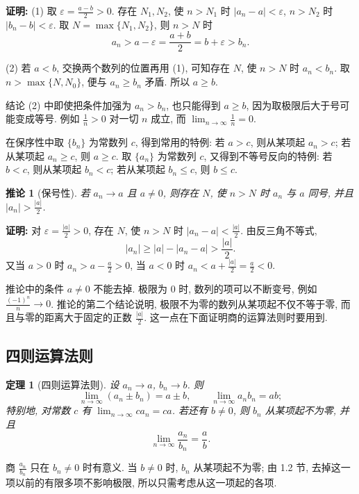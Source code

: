 \documentclass[UTF8,openany]{ctexbook}
\theoremstyle{chinesetextbook}
\newtheorem{theorem}{定理}[section]
\newenvironment{cnproof}{\par\indent\textbf{证明:} \ignorespaces}{\par}
\newtheorem*{corollarysingle}{推论}
\begin{document}
\begin{cnproof}
(1) 取 $\displaystyle\varepsilon=\frac{a-b}2>0$. 存在 $N_1,N_2$, 使 $n>N_1$ 时 $|a_n-a|<\varepsilon$, $n>N_2$ 时 $|b_n-b|<\varepsilon$. 取 $N=\max\{N_1,N_2\}$, 则 $n>N$ 时
\[
a_n>a-\varepsilon=\frac{a+b}2=b+\varepsilon>b_n.
\]

(2) 若 $a<b$, 交换两个数列的位置再用 (1), 可知存在 $N$, 使 $n>N$ 时 $a_n<b_n$. 取 $n>\max\{N,N_0\}$, 便与 $a_n\ge b_n$ 矛盾. 所以 $a\ge b$.
\end{cnproof}
结论 (2) 中即使把条件加强为 $a_n>b_n$, 也只能得到 $a\ge b$, 因为取极限后大于号可能变成等号. 例如 $\displaystyle\frac1n>0$ 对一切 $n$ 成立, 而 $\displaystyle\lim_{n\to\infty}\frac1n=0$.

在保序性中取 $\{b_n\}$ 为常数列 $c$, 得到常用的特例: 若 $a>c$, 则从某项起 $a_n>c$; 若从某项起 $a_n\ge c$, 则 $a\ge c$. 取 $\{a_n\}$ 为常数列 $c$, 又得到不等号反向的特例: 若 $b<c$, 则从某项起 $b_n<c$; 若从某项起 $b_n\le c$, 则 $b\le c$.
\begin{corollarysingle}[保号性]
若 $a_n\to a$ 且 $a\ne0$, 则存在 $N$, 使 $n>N$ 时 $a_n$ 与 $a$ 同号, 并且 $\displaystyle|a_n|>\frac{|a|}2$.
\end{corollarysingle}
\begin{cnproof}
对 $\displaystyle\varepsilon=\frac{|a|}2>0$, 存在 $N$, 使 $n>N$ 时 $\displaystyle|a_n-a|<\frac{|a|}2$. 由反三角不等式,
\[
|a_n|\ge|a|-|a_n-a|>\frac{|a|}2.
\]
又当 $a>0$ 时 $\displaystyle a_n>a-\frac a2>0$, 当 $a<0$ 时 $\displaystyle a_n<a+\frac{|a|}2=\frac a2<0$.
\end{cnproof}
推论中的条件 $a\ne0$ 不能去掉. 极限为 $0$ 时, 数列的项可以不断变号, 例如 $\displaystyle\frac{(-1)^n}n\to0$. 推论的第二个结论说明, 极限不为零的数列从某项起不仅不等于零, 而且与零的距离大于固定的正数 $\displaystyle\frac{|a|}2$. 这一点在下面证明商的运算法则时要用到.
\subsection{四则运算法则}
\begin{theorem}[四则运算法则]
设 $a_n\to a$, $b_n\to b$. 则
\[
\lim_{n\to\infty}(a_n\pm b_n)=a\pm b,\qquad \lim_{n\to\infty}a_nb_n=ab;
\]
特别地, 对常数 $c$ 有 $\displaystyle\lim_{n\to\infty}ca_n=ca$. 若还有 $b\ne0$, 则 $b_n$ 从某项起不为零, 并且
\[
\lim_{n\to\infty}\frac{a_n}{b_n}=\frac ab.
\]
\end{theorem}
商 $\displaystyle\frac{a_n}{b_n}$ 只在 $b_n\ne0$ 时有意义. 当 $b\ne0$ 时, $b_n$ 从某项起不为零; 由 1.2 节, 去掉这一项以前的有限多项不影响极限, 所以只需考虑从这一项起的各项.
\end{document}
